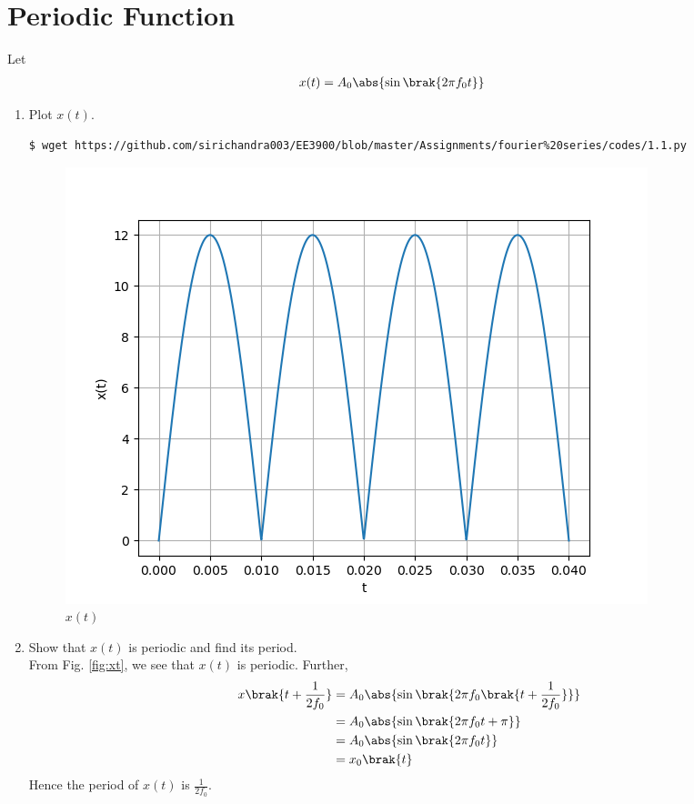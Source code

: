 \documentclass[journal,12pt,twocolumn]{IEEEtran}
\renewcommand\thesection{\arabic{section}}
\begin{document}
\section{Periodic Function}
Let
\begin{align}
x(t) &= A_0\abs{\sin\brak{2\pi f_0 t}}
\label{eq:10-orig-diff-def}
\end{align}
\begin{enumerate}[label=\thesection.\arabic*
,ref=\thesection.\theenumi]
\item Plot $x(t)$.
\\
\solution
\begin{lstlisting}
$ wget https://github.com/sirichandra003/EE3900/blob/master/Assignments/fourier%20series/codes/1.1.py
\end{lstlisting}
\begin{figure}[!ht]
\includegraphics[width=\columnwidth]{figs/1.1.png}
\caption{$x(t)$}
\label{fig:xt}
\end{figure}
\item Show that $x(t)$ is periodic and find its period. \\
\solution From Fig. \eqref{fig:xt}, we see that $x(t)$ is periodic. Further,
\begin{align}
x\brak{t+\frac{1}{2f_0}} &= A_0\abs{\sin\brak{2\pi f_0\brak{t + \frac{1}{2f_0}}}} \\
&= A_0\abs{\sin\brak{2\pi f_0t + \pi}} \\
&= A_0\abs{\sin\brak{2\pi f_0t}} \\
&= x_0\brak{t}
\end{align}
Hence the period of $x(t)$ is $\frac{1}{2f_0}$.
\end{enumerate}
\end{document}
